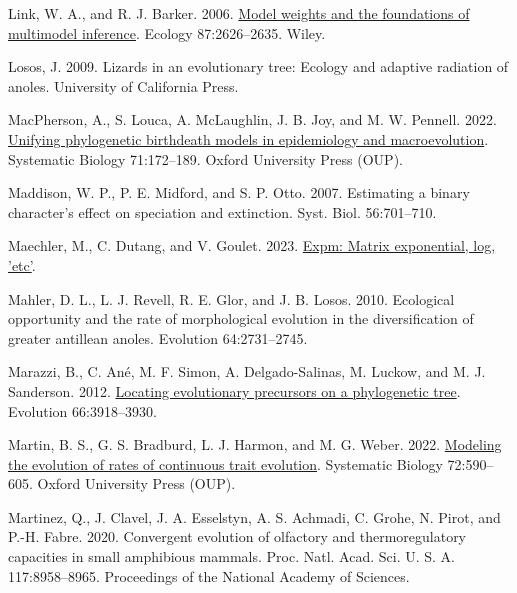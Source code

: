 \documentclass[fleqn,10pt,lineno]{wlpeerj} %
\newlength{\cslhangindent}
\newlength{\cslentryspacingunit} %
\newenvironment{CSLReferences}[2] %
 {%
  \setlength{\parindent}{0pt}
  \ifodd #1
  \let\oldpar\par
  \def\par{\hangindent=\cslhangindent\oldpar}
  \fi
  \setlength{\parskip}{#2\cslentryspacingunit}
 }%
 {}
\begin{document}
\begin{CSLReferences}{1}{0}
\leavevmode{}%
Link, W. A., and R. J. Barker. 2006. \href{https://doi.org/10.1890/0012-9658(2006)87\%5B2626:mwatfo\%5D2.0.co;2}{Model weights and the foundations of multimodel inference}. Ecology 87:2626--2635. Wiley.

\leavevmode{}%
Losos, J. 2009. Lizards in an evolutionary tree: Ecology and adaptive radiation of anoles. University of California Press.

\leavevmode{}%
MacPherson, A., S. Louca, A. McLaughlin, J. B. Joy, and M. W. Pennell. 2022. \href{https://doi.org/10.1093/sysbio/syab049}{Unifying phylogenetic birth{\textendash}death models in epidemiology and macroevolution}. Systematic Biology 71:172--189. Oxford University Press ({OUP}).

\leavevmode{}%
Maddison, W. P., P. E. Midford, and S. P. Otto. 2007. Estimating a binary character's effect on speciation and extinction. Syst. Biol. 56:701--710.

\leavevmode{}%
Maechler, M., C. Dutang, and V. Goulet. 2023. \href{https://CRAN.R-project.org/package=expm}{Expm: Matrix exponential, log, 'etc'}.

\leavevmode{}%
Mahler, D. L., L. J. Revell, R. E. Glor, and J. B. Losos. 2010. Ecological opportunity and the rate of morphological evolution in the diversification of greater antillean anoles. Evolution 64:2731--2745.

\leavevmode{}%
Marazzi, B., C. Ané, M. F. Simon, A. Delgado-Salinas, M. Luckow, and M. J. Sanderson. 2012. \href{https://doi.org/10.1111/j.1558-5646.2012.01720.x}{Locating evolutionary precursors on a phylogenetic tree}. Evolution 66:3918--3930.

\leavevmode{}%
Martin, B. S., G. S. Bradburd, L. J. Harmon, and M. G. Weber. 2022. \href{https://doi.org/10.1093/sysbio/syac068}{Modeling the evolution of rates of continuous trait evolution}. Systematic Biology 72:590--605. Oxford University Press ({OUP}).

\leavevmode{}%
Martinez, Q., J. Clavel, J. A. Esselstyn, A. S. Achmadi, C. Grohe, N. Pirot, and P.-H. Fabre. 2020. Convergent evolution of olfactory and thermoregulatory capacities in small amphibious mammals. Proc. Natl. Acad. Sci. U. S. A. 117:8958--8965. Proceedings of the National Academy of Sciences.


\end{CSLReferences}
\end{document}
